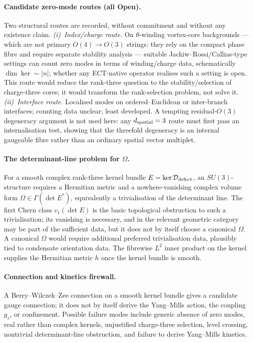 
\paragraph{Candidate zero-mode routes (all Open).}
Two structural routes are recorded, without commitment and without
any existence claim.
\emph{(i)~Index/charge route.}
On $\theta$-winding vortex-core backgrounds --- which are not
primary $O(4)\to O(3)$ strings: they rely on the compact phase
fibre and require separate stability analysis --- suitable
Jackiw--Rossi/Callias-type settings can count zero modes in terms
of winding/charge data, schematically $\dim\ker\sim|n|$; whether
any ECT-native operator realises such a setting is open.
This route would reduce the rank-three question to the
stability/selection of charge-three cores; it would transform the
rank-selection problem, not solve it.
\emph{(ii)~Interface route.}
Localised modes on ordered--Euclidean or inter-branch interfaces;
counting data unclear; least developed.
A tempting residual-$O(3)$ degeneracy argument is not used here:
any $d_{\rm spatial}=3$ route must first pass an internalisation
test, showing that the threefold degeneracy is an internal
gaugeable fibre rather than an ordinary spatial vector multiplet.

\paragraph{The determinant-line problem for $\Omega$.}
For a smooth complex rank-three kernel bundle
$E=\ker\mathcal{D}_{\rm defect}$, an $SU(3)$-structure requires a
Hermitian metric and a nowhere-vanishing complex volume form
$\Omega\in\Gamma(\det E^{*})$, equivalently a trivialisation of
the determinant line.
The first Chern class $c_1(\det E)$ is the basic topological
obstruction to such a trivialisation; its vanishing is necessary,
and in the relevant geometric category may be part of the
sufficient data, but it does not by itself choose a canonical
$\Omega$.
A canonical $\Omega$ would require additional preferred
trivialisation data, plausibly tied to condensate orientation
data.
The fibrewise $L^2$ inner product on the kernel supplies the
Hermitian metric $h$ once the kernel bundle is smooth.

\paragraph{Connection and kinetics firewall.}
A Berry--Wilczek--Zee connection on a smooth kernel bundle gives a
candidate gauge connection; it does not by itself derive the
Yang--Mills action, the coupling $g_s$, or confinement.
Possible failure modes include generic absence of zero modes, real
rather than complex kernels, unjustified charge-three selection,
level crossing, nontrivial determinant-line obstruction, and
failure to derive Yang--Mills kinetics.
